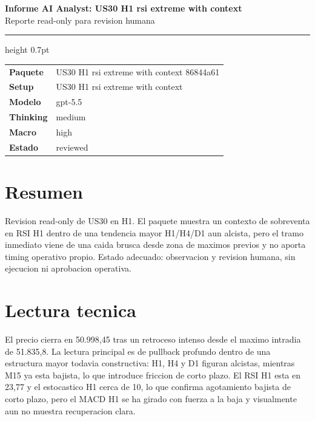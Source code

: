 \documentclass[11pt,a4paper]{article}
\begin{document}
\begin{center}
{\huge\bfseries Informe AI Analyst: US30 H1 rsi extreme with context}\\[0.25em]
{\large Reporte read-only para revision humana}
\end{center}

\vspace{0.2em}
\hrule height 0.7pt
\vspace{0.9em}

\begin{tabularx}{\textwidth}{>{\bfseries}p{3.2cm}X}
Paquete & US30 H1 rsi extreme with context 86844a61 \\
Setup & US30 H1 rsi extreme with context \\
Modelo & gpt-5.5 \\
Thinking & medium \\
Macro & high \\
Estado & reviewed \\
\end{tabularx}

\vspace{0.75em}

\vspace{0.4em}

\section*{Resumen}
Revision read-only de US30 en H1. El paquete muestra un contexto de sobreventa en RSI H1 dentro de una tendencia mayor H1/H4/D1 aun alcista, pero el tramo inmediato viene de una caida brusca desde zona de maximos previos y no aporta timing operativo propio. Estado adecuado: observacion y revision humana, sin ejecucion ni aprobacion operativa.

\section*{Lectura tecnica}
El precio cierra en 50.998,45 tras un retroceso intenso desde el maximo intradia de 51.835,8. La lectura principal es de pullback profundo dentro de una estructura mayor todavia constructiva: H1, H4 y D1 figuran alcistas, mientras M15 ya esta bajista, lo que introduce friccion de corto plazo. El RSI H1 esta en 23,77 y el estocastico H1 cerca de 10, lo que confirma agotamiento bajista de corto plazo, pero el MACD H1 se ha girado con fuerza a la baja y visualmente aun no muestra recuperacion clara.
\end{document}
